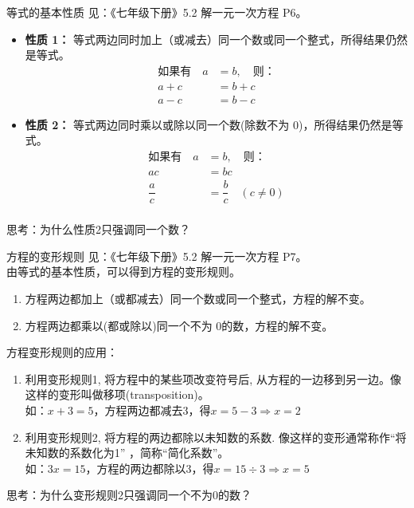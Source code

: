 \documentclass{ctexbeamer}
\begin{document}
\begin{frame}[t]{等式的基本性质}
见：《七年级下册》5.2 解一元一次方程 P6。\\
\begin{itemize}
\item \textbf{性质 1：} 等式两边同时加上（或减去）\alert{同一个数或同一个整式}，所得结果仍然是等式。
\begin{align*}
\text{如果有} \quad a &= b, \quad \text{则：}\\
a + c &= b + c \\
a - c &= b - c
\end{align*}

\item \textbf{性质 2：} 等式两边同时乘以或除以\alert{同一个数(除数不为 0)}，所得结果仍然是等式。
\begin{align*}
\text{如果有} \quad a &= b, \quad \text{则：}\\
ac &= bc \\
\dfrac{a}{c} &= \dfrac{b}{c}  \quad (c \neq 0) \\
\end{align*}
\end{itemize}
思考：为什么性质2只强调同一个数？
\end{frame}

\begin{frame}[t]{方程的变形规则}
见：《七年级下册》5.2 解一元一次方程 P7。\\
由等式的基本性质，可以得到\alert{方程的变形规则}。
\begin{enumerate}[label={\arabic*.}]
\item 方程两边都加上（或都减去）\alert{同一个数或同一个整式}，方程的解不变。
\item 方程两边都乘以(都或除以)\alert{同一个不为 0的数}，方程的解不变。
\end{enumerate}
\vspace{1em}
方程变形规则的应用：
\begin{enumerate}[label={\arabic*.}]
\item 利用变形规则1, 将方程中的某些项改变符号后, 从方程的一边移到另一边。像这样的变形叫做\alert{移项(transposition)}。\\
如：$x + 3 = 5$，方程两边都减去$3$，得$x = 5 - 3 \Rightarrow x = 2$
\vspace{1em}

\item 利用变形规则2, 将方程的两边都除以未知数的系数. 像这样的变形通常称作\alert{“将未知数的系数化为1” }，简称\alert{“简化系数”}。 \\
如：$3x = 15$，方程的两边都除以$3$，得$x = 15 \div 3 \Rightarrow x = 5$
\end{enumerate}
思考：为什么变形规则2只强调\alert{同一个不为0的数}？
\end{frame}
\end{document}
